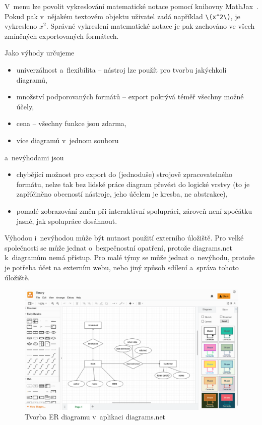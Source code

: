 V~menu  lze povolit vykreslování matematické notace pomocí knihovny MathJax~\cite{mathjax2022}.
Pokud pak v~nějakém textovém objektu uživatel zadá například \verb|\(x^2\)|, je vykresleno $x^2$.
Správné vykreslení matematické notace je pak zachováno ve všech zmíněných exportovaných formátech.

Jako výhody určujeme
\begin{itemize}
  \item univerzálnost a~flexibilita -- nástroj lze použít pro tvorbu jakýchkoli diagramů,
  \item množství podporovaných formátů -- export pokrývá téměř všechny možné účely,
  \item cena -- všechny funkce jsou zdarma,
  \item více diagramů v~jednom souboru
\end{itemize}
a~nevýhodami jsou
\begin{itemize}
  \item chybějící možnost pro export do (jednoduše) strojově zpracovatelného formátu, nelze tak bez lidské práce diagram převést do logické vrstvy (to je zapříčiněno obecností nástroje, jeho účelem je kresba, ne abstrakce),
  \item pomalé zobrazování změn při interaktivní spolupráci, zároveň není zpočátku jasné, jak spolupráce dosáhnout.
\end{itemize}

Výhodou i~nevýhodou může být nutnost použití externího úložiště.
Pro velké společnosti se může jednat o~bezpečnostní opatření, protože diagrams.net k~diagramům nemá přístup.
Pro malé týmy se může jednat o~nevýhodu, protože je potřeba účet na externím webu, nebo jiný způsob sdílení a~správa tohoto úložiště.

\begin{figure}
  \centering
  \includegraphics[width = \textwidth]{../img/diagrams.net.png}
  \caption{Tvorba ER diagramu v~aplikaci diagrams.net}
  \label{fig:diagrams.net}
\end{figure}

